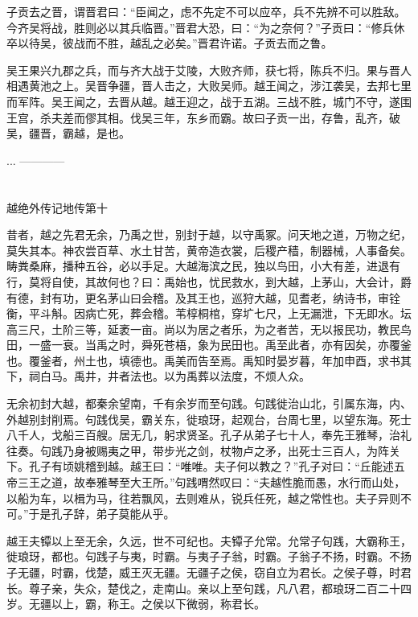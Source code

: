 \documentclass[12pt,UTF8]{ctexbook}
\begin{document}
子贡去之晋，谓晋君曰：“臣闻之，虑不先定不可以应卒，兵不先辨不可以胜敌。今齐吴将战，胜则必以其兵临晋。”晋君大恐，曰：“为之奈何？”子贡曰：“修兵休卒以待吴，彼战而不胜，越乱之必矣。”晋君许诺。子贡去而之鲁。

吴王果兴九郡之兵，而与齐大战于艾陵，大败齐师，获七将，陈兵不归。果与晋人相遇黄池之上。吴晋争疆，晋人击之，大败吴师。越王闻之，涉江袭吴，去邦七里而军阵。吴王闻之，去晋从越。越王迎之，战于五湖。三战不胜，城门不守，遂围王宫，杀夫差而僇其相。伐吴三年，东乡而霸。故曰子贡一出，存鲁，乱齐，破吴，疆晋，霸越，是也。

...
------------

\part{}

越绝外传记地传第十

昔者，越之先君无余，乃禹之世，别封于越，以守禹冢。问天地之道，万物之纪，莫失其本。神农尝百草、水土甘苦，黄帝造衣裳，后稷产穑，制器械，人事备矣。畴粪桑麻，播种五谷，必以手足。大越海滨之民，独以鸟田，小大有差，进退有行，莫将自使，其故何也？曰：禹始也，忧民救水，到大越，上茅山，大会计，爵有德，封有功，更名茅山曰会稽。及其王也，巡狩大越，见耆老，纳诗书，审铨衡，平斗斛。因病亡死，葬会稽。苇椁桐棺，穿圹七尺，上无漏泄，下无即水。坛高三尺，土阶三等，延袤一亩。尚以为居之者乐，为之者苦，无以报民功，教民鸟田，一盛一衰。当禹之时，舜死苍梧，象为民田也。禹至此者，亦有因矣，亦覆釜也。覆釜者，州土也，填德也。禹美而告至焉。禹知时晏岁暮，年加申酉，求书其下，祠白马。禹井，井者法也。以为禹葬以法度，不烦人众。

无余初封大越，都秦余望南，千有余岁而至句践。句践徙治山北，引属东海，内、外越别封削焉。句践伐吴，霸关东，徙琅玡，起观台，台周七里，以望东海。死士八千人，戈船三百艘。居无几，躬求贤圣。孔子从弟子七十人，奉先王雅琴，治礼往奏。句践乃身被赐夷之甲，带步光之剑，杖物卢之矛，出死士三百人，为阵关下。孔子有顷姚稽到越。越王曰：“唯唯。夫子何以教之？”孔子对曰：“丘能述五帝三王之道，故奉雅琴至大王所。”句践喟然叹曰：“夫越性脆而愚，水行而山处，以船为车，以楫为马，往若飘风，去则难从，锐兵任死，越之常性也。夫子异则不可。”于是孔子辞，弟子莫能从乎。

越王夫镡以上至无余，久远，世不可纪也。夫镡子允常。允常子句践，大霸称王，徙琅玡，都也。句践子与夷，时霸。与夷子子翁，时霸。子翁子不扬，时霸。不扬子无疆，时霸，伐楚，威王灭无疆。无疆子之侯，窃自立为君长。之侯子尊，时君长。尊子亲，失众，楚伐之，走南山。亲以上至句践，凡八君，都琅玡二百二十四岁。无疆以上，霸，称王。之侯以下微弱，称君长。
\end{document}
